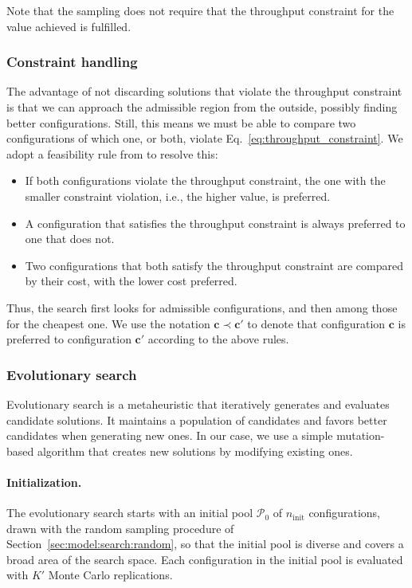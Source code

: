 \documentclass[smallextended]{svjour3}       %
\begin{document}
Note that the sampling does not require that the throughput constraint for the value achieved is fulfilled. 

\subsubsection{Constraint handling}

The advantage of not discarding solutions that violate the throughput constraint is that we can approach the admissible region from the outside, possibly finding better configurations. Still, this means we must be able to compare two configurations of which one, or both, violate Eq.~\eqref{eq:throughput_constraint}. We adopt a feasibility rule from \cite{deb2000efficient} to resolve this:
\begin{itemize}
  \item If both configurations violate the throughput constraint, the one with the smaller constraint violation, i.e., the higher value, is preferred.
  \item A configuration that satisfies the throughput constraint is always preferred to one that does not.
  \item Two configurations that both satisfy the throughput constraint are compared by their cost, with the lower cost preferred.
\end{itemize}
Thus, the search first looks for admissible configurations, and then among those for the cheapest one. We use the notation $\mathbf{c} \prec \mathbf{c}'$ to denote that configuration $\mathbf{c}$ is preferred to configuration $\mathbf{c}'$ according to the above rules.

\subsubsection{Evolutionary search}
\label{sec:model:search:evo}

Evolutionary search is a metaheuristic that iteratively generates and evaluates candidate solutions. It maintains a population of candidates and favors better candidates when generating new ones. In our case, we use a simple mutation-based algorithm that creates new solutions by modifying existing ones.

\paragraph{Initialization.}
The evolutionary search starts with an initial pool $\mathcal{P}_0$ of $n_\mathrm{init}$ configurations, drawn with the random sampling procedure of Section~\ref{sec:model:search:random}, so that the initial pool is diverse and covers a broad area of the search space. Each configuration in the initial pool is evaluated with $K'$ Monte Carlo replications.
\end{document}
